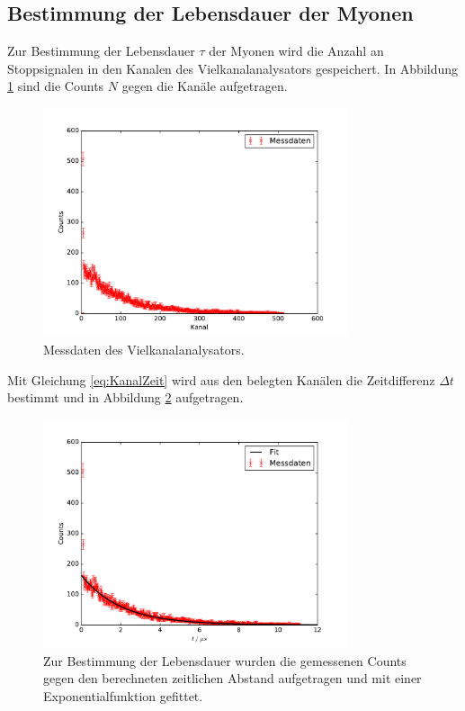 \subsection{Bestimmung der Lebensdauer der Myonen}
Zur Bestimmung der Lebensdauer $\tau$ der Myonen wird die Anzahl an Stoppsignalen in den Kanalen des Vielkanalanalysators gespeichert.
In Abbildung \ref{fig:KanalCount} sind die Counts $N$ gegen die Kanäle aufgetragen.
\begin{figure}
  \centering
  \includegraphics[width=0.8\textwidth]{plots/KanalCounts.pdf}
  \caption{Messdaten des Vielkanalanalysators.}
  \label{fig:KanalCount}
\end{figure}
Mit Gleichung \ref{eq:KanalZeit} wird aus den belegten Kanälen die Zeitdifferenz $\Delta t$ bestimmt und in Abbildung
\ref{fig:ZeitCounts} aufgetragen.
\begin{figure}
  \centering
  \includegraphics[width=0.8\textwidth]{plots/ZeitCounts.pdf}
  \caption{Zur Bestimmung der Lebensdauer wurden die gemessenen Counts gegen den berechneten
    zeitlichen Abstand aufgetragen und mit einer Exponentialfunktion gefittet.}
  \label{fig:ZeitCounts}
\end{figure}
